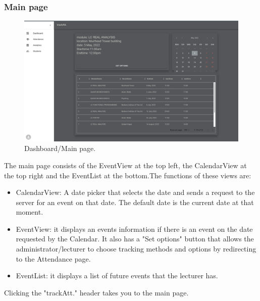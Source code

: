 \subsubsection{Main page}
\begin{figure}[ht!]
  \includegraphics[scale=0.135]{Design & Implementation/images/Dashboard.png}
  \caption{Dashboard/Main page.}
\end{figure}
The main page consists of the EventView at the top left, the CalendarView at the top right and the EventList at the bottom.The functions of these views are:
\begin{itemize}
  \item CalendarView: A date picker that selects the date and sends a request to the server for an event on that date. The default date is the current date at that moment.
  \item EventView: it displays an events information if there is an event on the date requested by the Calendar. It also has a "Set options" button that allows the administrator/lecturer to choose tracking methods and options by redirecting to the Attendance page. 
  \item EventList: it displays a list of future events that the lecturer has.
\end{itemize}
Clicking the "trackAtt." header takes you to the main page.
